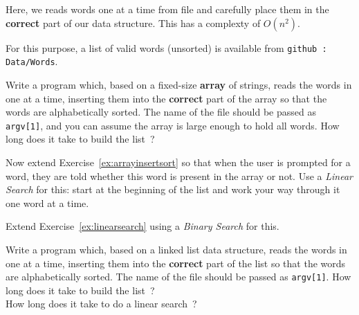 
Here, we reads words one at a time
from file and carefully place them in the {\bf correct} part of
our data structure. This has a complexty of $O(n^2)$.

For this purpose, a list of valid words (unsorted) is available
from \verb^github : Data/Words^.

\begin{exercise}
\label{ex:arrayinsertsort}
Write a program which, based on a
fixed-size {\bf array} of strings, reads the words in
one at a time, inserting them into the {\bf correct} part of the array
so that the words are alphabetically sorted.
The name of the file should be passed as \verb^argv[1]^,
and you can assume the array is large enough to hold all words.
How long does it take to build the list~?
\end{exercise}

\begin{exercise}
\label{ex:linearsearch}
Now extend Exercise~\ref{ex:arrayinsertsort}
so that when the user is prompted for a word,
they are told whether this word is present in the array or not.
Use a {\em Linear Search} for this: start at the beginning of the
list and work your way through it one word at a time.
\end{exercise}

\begin{exercise}
\label{ex:binarysearch}
Extend Exercise~\ref{ex:linearsearch} using a
{\em Binary Search} for this.
\end{exercise}

\begin{exercise}
\label{ex:linkedinsertsort}
Write a program which, based on a
linked list data structure, reads the words in
one at a time, inserting them into the {\bf correct} part of the list
so that the words are alphabetically sorted.
The name of the file should be passed as \verb^argv[1]^.
How long does it take to build the list~?\\
How long does it take to do a linear search~?
\end{exercise}
